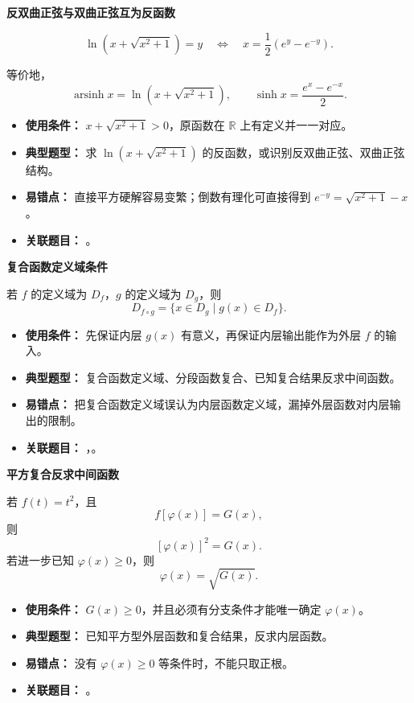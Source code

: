 \begin{knowledgeBox}
\textbf{反双曲正弦与双曲正弦互为反函数}

\[
\ln\left(x+\sqrt{x^2+1}\right)=y
\quad\Longleftrightarrow\quad
x=\frac12\left(e^y-e^{-y}\right).
\]

等价地，
\[
\operatorname{arsinh}x=\ln\left(x+\sqrt{x^2+1}\right),
\qquad
\sinh x=\frac{e^x-e^{-x}}{2}.
\]

\begin{itemize}
  \item \textbf{使用条件：} \(x+\sqrt{x^2+1}>0\)，原函数在 \(\mathbb{R}\) 上有定义并一一对应。
  \item \textbf{典型题型：} 求 \(\ln\left(x+\sqrt{x^2+1}\right)\) 的反函数，或识别反双曲正弦、双曲正弦结构。
  \item \textbf{易错点：} 直接平方硬解容易变繁；倒数有理化可直接得到 \(e^{-y}=\sqrt{x^2+1}-x\)。
  \item \textbf{关联题目：} 。
\end{itemize}

\textbf{复合函数定义域条件}

若 \(f\) 的定义域为 \(D_f\)，\(g\) 的定义域为 \(D_g\)，则
\[
D_{f\circ g}=\{x\in D_g\mid g(x)\in D_f\}.
\]

\begin{itemize}
  \item \textbf{使用条件：} 先保证内层 \(g(x)\) 有意义，再保证内层输出能作为外层 \(f\) 的输入。
  \item \textbf{典型题型：} 复合函数定义域、分段函数复合、已知复合结果反求中间函数。
  \item \textbf{易错点：} 把复合函数定义域误认为内层函数定义域，漏掉外层函数对内层输出的限制。
  \item \textbf{关联题目：} ，。
\end{itemize}

\textbf{平方复合反求中间函数}

若 \(f(t)=t^2\)，且
\[
f[\varphi(x)]=G(x),
\]
则
\[
[\varphi(x)]^2=G(x).
\]
若进一步已知 \(\varphi(x)\ge 0\)，则
\[
\varphi(x)=\sqrt{G(x)}.
\]

\begin{itemize}
  \item \textbf{使用条件：} \(G(x)\ge 0\)，并且必须有分支条件才能唯一确定 \(\varphi(x)\)。
  \item \textbf{典型题型：} 已知平方型外层函数和复合结果，反求内层函数。
  \item \textbf{易错点：} 没有 \(\varphi(x)\ge 0\) 等条件时，不能只取正根。
  \item \textbf{关联题目：} 。
\end{itemize}


\end{knowledgeBox}
